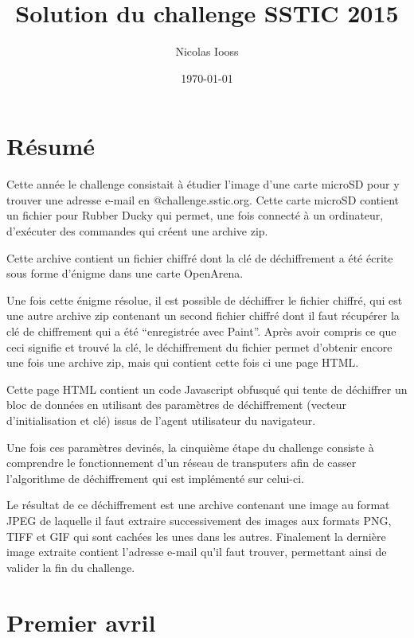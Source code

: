 \documentclass[a4paper,10pt]{article}
\title{Solution du challenge SSTIC 2015}
\author{Nicolas Iooss}
\date{\today}
\begin{document}
\maketitle

\section*{Résumé}

Cette année le challenge consistait à étudier l'image d'une carte microSD pour y trouver une adresse e-mail en @challenge.sstic.org.
Cette carte microSD contient un fichier pour Rubber Ducky qui permet, une fois connecté à un ordinateur, d'exécuter des commandes qui créent une archive zip.

Cette archive contient un fichier chiffré dont la clé de déchiffrement a été écrite sous forme d'énigme dans une carte OpenArena.

Une fois cette énigme résolue, il est possible de déchiffrer le fichier chiffré, qui est une autre archive zip contenant un second fichier chiffré dont il faut récupérer la clé de chiffrement qui a été ``enregistrée avec Paint''.
Après avoir compris ce que ceci signifie et trouvé la clé, le déchiffrement du fichier permet d'obtenir encore une fois une archive zip, mais qui contient cette fois ci une page HTML.

Cette page HTML contient un code Javascript obfusqué qui tente de déchiffrer un bloc de données en utilisant des paramètres de déchiffrement (vecteur d'initialisation et clé) issus de l'agent utilisateur du navigateur.

Une fois ces paramètres devinés, la cinquième étape du challenge consiste à comprendre le fonctionnement d'un réseau de transputers afin de casser l'algorithme de déchiffrement qui est implémenté sur celui-ci.

Le résultat de ce déchiffrement est une archive contenant une image au format JPEG de laquelle il faut extraire successivement des images aux formats PNG, TIFF et GIF qui sont cachées les unes dans les autres.
Finalement la dernière image extraite contient l'adresse e-mail qu'il faut trouver, permettant ainsi de valider la fin du challenge.

\clearpage
\tableofcontents

\setcounter{section}{-1} %

\clearpage
\section{Premier avril}
\end{document}
